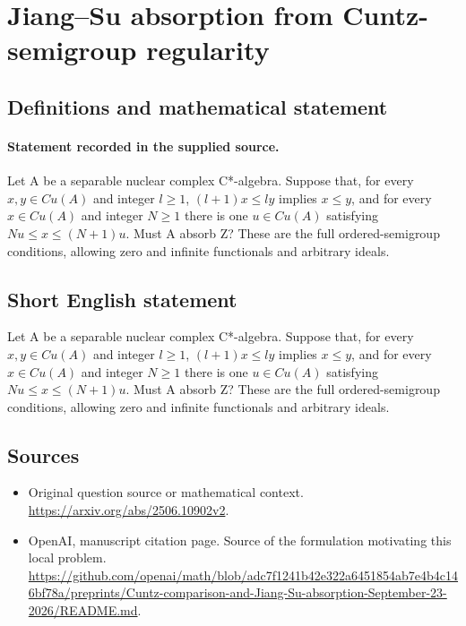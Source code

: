 \documentclass[11pt]{article}
\begin{document}
\section*{Jiang–Su absorption from Cuntz-semigroup regularity}\label{statement}
\subsection{Definitions and mathematical statement}
\paragraph{Statement recorded in the supplied source.}
Let A be a separable nuclear complex C*-algebra. Suppose that, for every $x,y\in Cu(A)$ and integer $l\geq 1$, $(l+1)x\leq ly$ implies $x\leq y$, and for every $x\in Cu(A)$ and integer $N\geq 1$ there is one $u\in Cu(A)$ satisfying $Nu\leq x\leq (N+1)u$. Must A absorb Z? These are the full ordered-semigroup conditions, allowing zero and infinite functionals and arbitrary ideals.
\subsection{Short English statement}
Let A be a separable nuclear complex C*-algebra. Suppose that, for every $x,y\in Cu(A)$ and integer $l\geq 1$, $(l+1)x\leq ly$ implies $x\leq y$, and for every $x\in Cu(A)$ and integer $N\geq 1$ there is one $u\in Cu(A)$ satisfying $Nu\leq x\leq (N+1)u$. Must A absorb Z? These are the full ordered-semigroup conditions, allowing zero and infinite functionals and arbitrary ideals.
\subsection{Sources}
\begin{itemize}
\item[S1] Original question source or mathematical context.
\url{https://arxiv.org/abs/2506.10902v2}.
\item[S2] OpenAI, manuscript citation page. Source of the formulation motivating this local problem.
\url{https://github.com/openai/math/blob/adc7f1241b42e322a6451854ab7e4b4c146bf78a/preprints/Cuntz-comparison-and-Jiang-Su-absorption-September-23-2026/README.md}.
\end{itemize}
\end{document}
